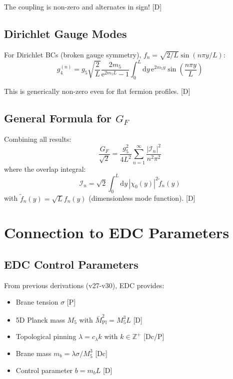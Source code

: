 \documentclass[11pt,a4paper]{article}
\newcommand{\dd}{\mathrm{d}}
\newcommand{\ee}{\mathrm{e}}
\newcommand{\Mpl}{\bar{M}_{\mathrm{Pl}}}
\begin{document}
The coupling is non-zero and alternates in sign! [D]

\subsection{Dirichlet Gauge Modes}

For Dirichlet BCs (broken gauge symmetry), $f_n = \sqrt{2/L}\sin(n\pi y/L)$:
\begin{equation}
g_4^{(n)} = g_5 \sqrt{\frac{2}{L}} \frac{2m_5}{\ee^{2m_5 L} - 1}
\int_0^L \dd y\, \ee^{2m_5 y} \sin\left(\frac{n\pi y}{L}\right)
\label{eq:dirichlet-coupling}
\end{equation}

This is generically non-zero even for flat fermion profiles. [D]

\subsection{General Formula for $G_F$}

Combining all results:
\begin{equation}
\boxed{
\frac{G_F}{\sqrt{2}} = \frac{g_5^2}{4L^2} \sum_{n=1}^{\infty}
\frac{|\mathcal{I}_n|^2}{n^2\pi^2}
}
\label{eq:gf-general}
\end{equation}
where the overlap integral:
\begin{equation}
\mathcal{I}_n = \sqrt{2} \int_0^L \dd y\, |\chi_0(y)|^2 \tilde{f}_n(y)
\label{eq:overlap-integral}
\end{equation}
with $\tilde{f}_n(y) = \sqrt{L} f_n(y)$ (dimensionless mode function). [D]

\section{Connection to EDC Parameters}
\label{sec:edc}

\subsection{EDC Control Parameters}

From previous derivations (v27-v30), EDC provides:
\begin{itemize}
\item Brane tension $\sigma$ [P]
\item 5D Planck mass $M_5$ with $\Mpl^2 = M_5^3 L$ [D]
\item Topological pinning $\lambda = c_\lambda k$ with $k \in \mathbb{Z}^+$ [Dc/P]
\item Brane mass $m_b = \lambda\sigma/M_5^3$ [Dc]
\item Control parameter $b = m_b L$ [D]
\end{itemize}
\end{document}
